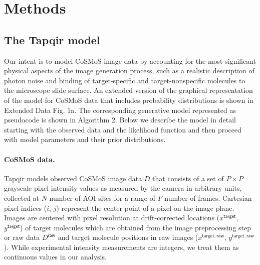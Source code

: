 \section*{Methods}

\subsection*{The Tapqir model} 

Our intent is to model CoSMoS image data by accounting for the most significant physical aspects of the image generation process, such as a realistic description of photon noise and binding of target-specific and target-nonspecific molecules to the microscope slide surface. An extended version of the graphical representation of the model for CoSMoS data that includes probability distributions is shown in Extended Data Fig. 1a. The corresponding generative model represented as pseudocode is shown in Algorithm 2. Below we describe the model in detail starting with the observed data and the likelihood function and then proceed with model parameters and their prior distributions.

\paragraph{CoSMoS data.} Tapqir models observed CoSMoS image data $D$ that consists of a set of $P \times P$ grayscale pixel intensity values as measured by the camera in arbitrary units, collected at $N$ number of AOI sites for a range of $F$ number of frames. Cartesian pixel indices ($i$, $j$) represent the center point of a pixel on the image plane. Images are centered with pixel resolution at drift-corrected locations ($x^\mathsf{target}$, $y^\mathsf{target}$) of target molecules which are obtained from the image preprocessing step or raw data $D^\mathsf{raw}$ and target molecule positions in raw images ($x^{\mathsf{target}, \mathsf{raw}}$, $y^{\mathsf{target}, \mathsf{raw}}$). While experimental intensity measurements are integers, we treat them as continuous values in our analysis.




